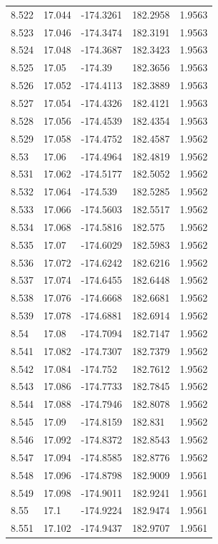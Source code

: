 \begin{tabular}{lllll}
8.522 & 17.044 & -174.3261 & 182.2958 & 1.9563 \\
8.523 & 17.046 & -174.3474 & 182.3191 & 1.9563 \\
8.524 & 17.048 & -174.3687 & 182.3423 & 1.9563 \\
8.525 & 17.05 & -174.39 & 182.3656 & 1.9563 \\
8.526 & 17.052 & -174.4113 & 182.3889 & 1.9563 \\
8.527 & 17.054 & -174.4326 & 182.4121 & 1.9563 \\
8.528 & 17.056 & -174.4539 & 182.4354 & 1.9563 \\
8.529 & 17.058 & -174.4752 & 182.4587 & 1.9562 \\
8.53 & 17.06 & -174.4964 & 182.4819 & 1.9562 \\
8.531 & 17.062 & -174.5177 & 182.5052 & 1.9562 \\
8.532 & 17.064 & -174.539 & 182.5285 & 1.9562 \\
8.533 & 17.066 & -174.5603 & 182.5517 & 1.9562 \\
8.534 & 17.068 & -174.5816 & 182.575 & 1.9562 \\
8.535 & 17.07 & -174.6029 & 182.5983 & 1.9562 \\
8.536 & 17.072 & -174.6242 & 182.6216 & 1.9562 \\
8.537 & 17.074 & -174.6455 & 182.6448 & 1.9562 \\
8.538 & 17.076 & -174.6668 & 182.6681 & 1.9562 \\
8.539 & 17.078 & -174.6881 & 182.6914 & 1.9562 \\
8.54 & 17.08 & -174.7094 & 182.7147 & 1.9562 \\
8.541 & 17.082 & -174.7307 & 182.7379 & 1.9562 \\
8.542 & 17.084 & -174.752 & 182.7612 & 1.9562 \\
8.543 & 17.086 & -174.7733 & 182.7845 & 1.9562 \\
8.544 & 17.088 & -174.7946 & 182.8078 & 1.9562 \\
8.545 & 17.09 & -174.8159 & 182.831 & 1.9562 \\
8.546 & 17.092 & -174.8372 & 182.8543 & 1.9562 \\
8.547 & 17.094 & -174.8585 & 182.8776 & 1.9562 \\
8.548 & 17.096 & -174.8798 & 182.9009 & 1.9561 \\
8.549 & 17.098 & -174.9011 & 182.9241 & 1.9561 \\
8.55 & 17.1 & -174.9224 & 182.9474 & 1.9561 \\
8.551 & 17.102 & -174.9437 & 182.9707 & 1.9561 \\

\end{tabular}
